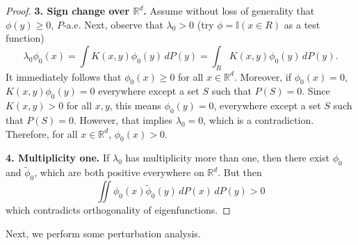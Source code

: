 \documentclass{article}
\newcommand{\Reals}{\mathbb{R}}
\newcommand{\1}{\mathbb{I}}
\newcommand{\Rd}{\Reals^d}
\newcommand{\wt}[1]{\widetilde{#1}}
\theoremstyle{alden}
\theoremstyle{aldenthm}
\theoremstyle{definition}
\theoremstyle{remark}
\begin{document}
\begin{proof}
	\textbf{3. Sign change over $\Reals^d$.}
	Assume without loss of generality that $\phi(y) \geq 0$, $P$-a.e. Next, observe that $\lambda_0 > 0$ (try $\phi = \1(x \in R)$ as a test function)
	\begin{equation*}
	\lambda_0 \phi_0(x) = \int K(x,y) \phi_0(y) \,dP(y) = \int_{R} K(x,y) \phi_0(y) \,dP(y).
	\end{equation*}
	It immediately follows that $\phi_0(x) \geq 0$ for all $x \in \Rd$. Moreover, if $\phi_0(x) = 0$, $K(x,y) \phi_0(y) = 0$ everywhere except a set $S$ such that $P(S) = 0$. Since $K(x,y) > 0$ for all $x,y$, this means $\phi_0(y) = 0$, everywhere except a set $S$ such that $P(S) = 0$. However, that implies $\lambda_0 = 0$, which is a contradiction. Therefore, for all $x \in \Rd$, $\phi_0(x) > 0$. 
	
	\textbf{4. Multiplicity one.}
	If $\lambda_0$ has multiplicity more than one, then there exist $\phi_0$ and $\wt{\phi}_0$, which are both positive everywhere on $\Rd$. But then
	\begin{equation*}
	\iint \phi_0(x) \wt{\phi}_0(y) \,dP(x) \,dP(y) > 0
	\end{equation*}
	which contradicts orthogonality of eigenfunctions.
\end{proof}

Next, we perform some perturbation analysis.
\end{document}
